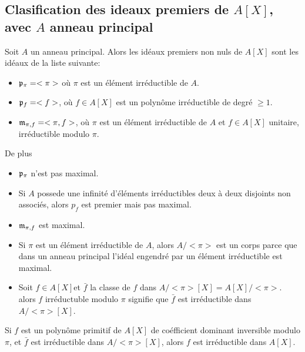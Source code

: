 \subsection{Clasification des ideaux premiers de $A[X]$, avec $A$ anneau principal}

\begin{theorem}
	Soit $A$ un anneau principal. Alors les idéaux premiers non nuls de $A[X]$ sont les idéaux de la liste suivante:
	\begin{itemize}
		\item $\mathfrak{p}_{\pi} = <\pi>$ où $\pi$ est un élément irréductible de $A$. %
		\item $\mathfrak{p}_f = <f>$, où $f \in A[X]$ est un polynôme irréductible de degré $\geq 1$.
		\item $\mathfrak{m}_{\pi,f} = <\pi,f>$, où $\pi$ est un élément irréductible de $A$ et $f \in A[X]$ unitaire, irréductible modulo $\pi$.
	\end{itemize}
	De plus
	\begin{itemize}
		\item $\mathfrak{p}_{\pi}$ n'est pas maximal.
		\item Si $A$ possede une infinité d'éléments irréductibles deux à deux disjoints non associés, alors $p_f$ est premier mais pas maximal.
		\item $\mathfrak{m}_{\pi,f}$ est maximal.
	\end{itemize}
\end{theorem}


\begin{rappel}[Irréductibilité]
	\begin{itemize}
		\item
		      Si $\pi$ est un élément irréductible de $A$, alors $A/<\pi>$ est un corps parce que dans un anneau
		      principal l'idéal engendré par un élément irréductible est maximal.\\
		\item Soit  $f \in A[X]$et $\bar{f}$ la classe de $f$ dans $A/<\pi>[X] = A[X]/<\pi>$.\\
		      alors $f$ irréductuble modulo $\pi$ signifie que $\bar{f}$ est irréductible dans $A/<\pi>[X]$.
	\end{itemize}
\end{rappel}

\begin{rappel}
	Si $f$ est un polynôme primitif de $A[X]$ de coéfficient dominant inversible modulo $\pi$, et $\bar{f}$ est irréductible dans $A/<\pi>[X]$, alors $f$ est irréductible dans $A[X]$.
\end{rappel}

